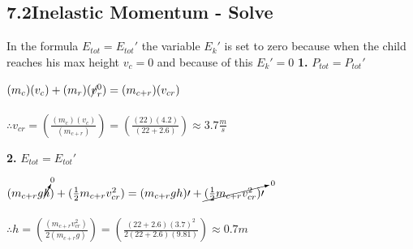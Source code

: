 \subsection*{7.2\hspace*{0.5cm}Inelastic Momentum - Solve}
In the formula $E_{tot} = E_{tot}\prime$ the variable $E_{k}\prime$ is set to zero because when the child reaches his max height $v_{c} = 0$ and because of this $E_{k}\prime = 0$\newline\newline
\textbf{1.} $P_{tot} = P_{tot}\prime$ \\
\begin{adjustwidth}{0.6cm}{0pt}
    $(m_{c})({v}_{c}) + (m_{r})(\cancel{v}_{r}^0) = (m_{c + r})(v_{cr})$ \\\\
    $\therefore v_{cr} = \left(\frac{(m_{c})(v_{c})}{(m_{c + r})}\right) = \left(\frac{(22)(4.2)}{(22 + 2.6)}\right) \approx 3.7\frac{m}{s}$
\end{adjustwidth}\vspace*{15pt}
\textbf{2.} $E_{tot} = E_{tot}\prime$ \\
\begin{adjustwidth}{0.6cm}{0pt}
    $(m_{c+r}g\cancelto{0}{h}) + (\frac{1}{2}m_{c+r}v_{cr}^2) = (m_{c + r}gh)\prime + \cancelto{0}{(\frac{1}{2}m_{c+r}v_{cr}^2)\prime}$ \\\\
    $\therefore h = \left(\frac{(m_{c+r}v_{cr}^2)}{2(m_{c+r}g)}\right) = \left(\frac{(22 + 2.6){(3.7)}^2}{2(22 + 2.6)(9.81)}\right) \approx 0.7m$
\end{adjustwidth}\vspace*{15pt}